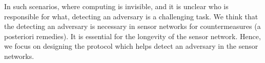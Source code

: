 	In such scenarios, where computing is invisible, and it is unclear who is responsible for what, detecting an adversary is a challenging task.
	We think that the detecting an adversary is necessary in sensor networks for countermeasures (a posteriori remedies).
	It is essential for the longevity of the sensor network.
	Hence, we focus on designing the protocol which helps detect an adversary in the sensor networks. 


